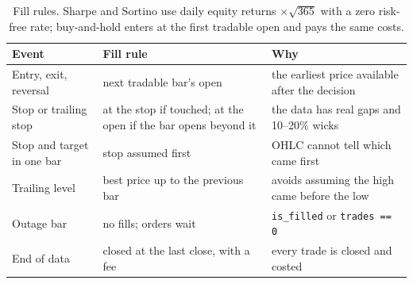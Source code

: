 \documentclass[11pt,a4paper]{article}
\theoremstyle{definition}
\begin{document}
\begin{table}[htbp]\centering\small
\begin{tabularx}{\linewidth}{@{}p{42mm}p{50mm}L@{}}
\toprule
\textbf{Event} & \textbf{Fill rule} & \textbf{Why}\\
\midrule
Entry, exit, reversal & next tradable bar's open & the earliest price available after the decision\\
Stop or trailing stop & at the stop if touched; at the open if the bar opens beyond it & the data has real gaps and 10--20\% wicks\\
Stop and target in one bar & stop assumed first & OHLC cannot tell which came first\\
Trailing level & best price up to the previous bar & avoids assuming the high came before the low\\
Outage bar & no fills; orders wait & \texttt{is\_filled} or \texttt{trades == 0}\\
End of data & closed at the last close, with a fee & every trade is closed and costed\\
\bottomrule
\end{tabularx}
\caption{Fill rules. Sharpe and Sortino use daily equity returns $\times\sqrt{365}$ with a zero risk-free rate; buy-and-hold enters at the first tradable open and pays the same costs.}
\end{table}
\end{document}

